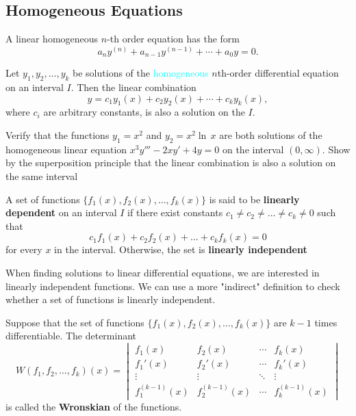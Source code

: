 \subsection{Homogeneous Equations}
  A linear homogeneous $n$-th order equation has the form
  \[
  a_n y^{(n)} + a_{n-1} y^{(n-1)} + \cdots + a_0 y = 0.
  \]


\begin{theorem}
 Let \(y_1,y_2,\ldots,y_k\) be solutions of the \textcolor{cyan}{homogeneous} \(n\)th-order differential equation on an interval \(I\).
  Then the linear combination 
  \[
  y = c_1y_1(x) + c_2y_2(x) + \cdots + c_ky_k(x),
  \]
  where \(c_i\) are arbitrary constants, is also a solution on the \(I\).
\end{theorem}



\begin{example}
  Verify that the functions \(y_1 = x^2\) and \(y_2=x^2\ln\,x\) are both solutions of the homogeneous linear equation
  \(x^3y''' - 2xy' + 4y =0\) on the interval \((0, \infty)\).
  Show by the superposition principle that the linear combination is also a solution on the same interval
\end{example}



\begin{definition}
  A set of functions \(\{f_1(x),f_2(x),\ldots,f_k(x)\}\) is said to be \textbf{linearly dependent} on an interval \(I\) if there exist constants
   \(c_1\neq c_2 \neq \ldots \neq c_k \neq 0\) such that
   \[
   c_1f_1(x) + c_2f_2(x) + \ldots + c_kf_k(x) = 0
   \]
   for every \(x\) in the interval.
   Otherwise, the set is \textbf{linearly independent}
\end{definition}

When finding solutions to linear differential equations, we are interested in linearly independent functions.
We can use a more "indirect" definition to check whether a set of functions is linearly independent.


\begin{definition}[Wronskian]
  Suppose that the set of functions \(\{f_1(x),f_2(x),\ldots,f_k(x)\}\) are \(k-1\) times differentiable.
  The determinant
  \[
    W(f_1, f_2, \dots, f_k)(x) =
    \begin{vmatrix}
    f_1(x) & f_2(x) & \cdots & f_k(x) \\
    f_1'(x) & f_2'(x) & \cdots & f_k'(x) \\
    \vdots & \vdots & \ddots & \vdots \\
    f_1^{(k-1)}(x) & f_2^{(k-1)}(x) & \cdots & f_k^{(k-1)}(x)
    \end{vmatrix}
  \]
  is called the \textbf{Wronskian} of the functions.
\end{definition}



